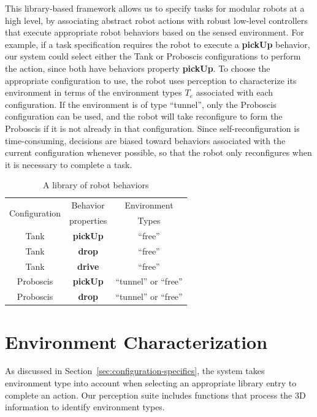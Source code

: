 \documentclass[conference]{IEEEtran}
\begin{document}
This library-based framework allows us to specify tasks for modular robots at a high level, by associating abstract robot actions with robust low-level controllers that execute appropriate robot behaviors based on the sensed environment. For example, if a task specification requires the robot to execute a \textbf{pickUp} behavior, our system could select either the Tank or Proboscis configurations to perform the action, since both have behaviors property \textbf{pickUp}. To choose the appropriate configuration to use, the robot uses perception to characterize its environment in terms of the environment types $T_e$ associated with each configuration. If the environment is of type ``tunnel'', only the Proboscis configuration can be used, and the robot will take  reconfigure to form the Proboscis if it is not already in that configuration. Since self-reconfiguration is time-consuming, decisions are biased toward behaviors associated with the current configuration whenever possible, so that the robot only reconfigures when it is necessary to complete a task.
%
\begin{table}
\centering
\begin{tabular}{ |c|c|c| } 
 \hline
 \multirow{2}{6em}{Configuration} & Behavior & Environment \\
 & properties & Types \\
 \hline
 Tank & \textbf{pickUp} & ``free'' \\\hline
 Tank & \textbf{drop} & ``free'' \\\hline
 Tank & \textbf{drive} & ``free''\\ \hline
 Proboscis & \textbf{pickUp} & ``tunnel'' or ``free''\\ \hline
 Proboscis & \textbf{drop} &``tunnel'' or ``free'' \\ 
 \hline
\end{tabular}
\caption{A library of robot behaviors}
\label{table:1}
\vspace{-1em}
\end{table}

%
%

\section{Environment Characterization}
\label{sec:environment-characterization}
%
As discussed in Section~\ref{sec:configuration-specifics}, the system takes environment type into account when selecting an appropriate library entry to complete an action. Our perception suite includes functions that process the 3D information to identify environment types.
\end{document}
